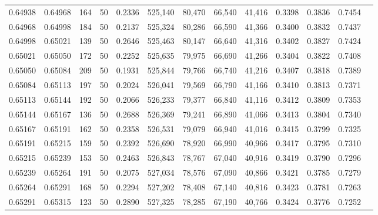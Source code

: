 \begin{tabular}{rrrrrrrrrrrrr}
0.64938 & 0.64968 &   164 &  50 &                                     0.2336 & 525,140 &  80,470 &  66,540 &  41,416 & 0.3398 & 0.3836 & 0.7454 \\
0.64968 & 0.64998 &   184 &  50 &                                     0.2137 & 525,324 &  80,286 &  66,590 &  41,366 & 0.3400 & 0.3832 & 0.7437 \\
0.64998 & 0.65021 &   139 &  50 &                                     0.2646 & 525,463 &  80,147 &  66,640 &  41,316 & 0.3402 & 0.3827 & 0.7424 \\
0.65021 & 0.65050 &   172 &  50 &                                     0.2252 & 525,635 &  79,975 &  66,690 &  41,266 & 0.3404 & 0.3822 & 0.7408 \\
0.65050 & 0.65084 &   209 &  50 &                                     0.1931 & 525,844 &  79,766 &  66,740 &  41,216 & 0.3407 & 0.3818 & 0.7389 \\
0.65084 & 0.65113 &   197 &  50 &                                     0.2024 & 526,041 &  79,569 &  66,790 &  41,166 & 0.3410 & 0.3813 & 0.7371 \\
0.65113 & 0.65144 &   192 &  50 &                                     0.2066 & 526,233 &  79,377 &  66,840 &  41,116 & 0.3412 & 0.3809 & 0.7353 \\
0.65144 & 0.65167 &   136 &  50 &                                     0.2688 & 526,369 &  79,241 &  66,890 &  41,066 & 0.3413 & 0.3804 & 0.7340 \\
0.65167 & 0.65191 &   162 &  50 &                                     0.2358 & 526,531 &  79,079 &  66,940 &  41,016 & 0.3415 & 0.3799 & 0.7325 \\
0.65191 & 0.65215 &   159 &  50 &                                     0.2392 & 526,690 &  78,920 &  66,990 &  40,966 & 0.3417 & 0.3795 & 0.7310 \\
0.65215 & 0.65239 &   153 &  50 &                                     0.2463 & 526,843 &  78,767 &  67,040 &  40,916 & 0.3419 & 0.3790 & 0.7296 \\
0.65239 & 0.65264 &   191 &  50 &                                     0.2075 & 527,034 &  78,576 &  67,090 &  40,866 & 0.3421 & 0.3785 & 0.7279 \\
0.65264 & 0.65291 &   168 &  50 &                                     0.2294 & 527,202 &  78,408 &  67,140 &  40,816 & 0.3423 & 0.3781 & 0.7263 \\
0.65291 & 0.65315 &   123 &  50 &                                     0.2890 & 527,325 &  78,285 &  67,190 &  40,766 & 0.3424 & 0.3776 & 0.7252 \\

\end{tabular}
